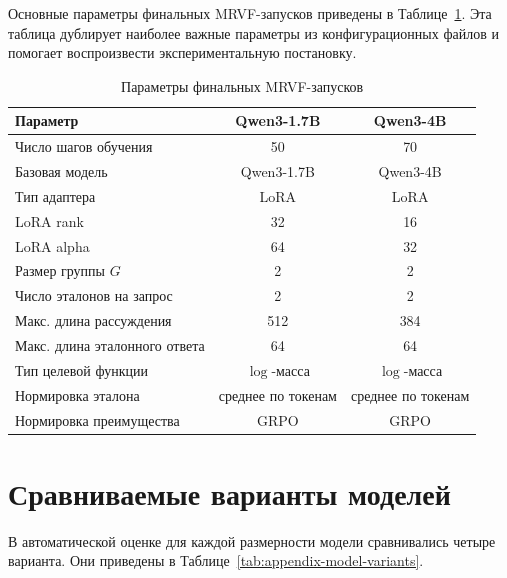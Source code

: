 Основные параметры финальных MRVF-запусков приведены в Таблице~\ref{tab:appendix-training-configs}. Эта таблица дублирует наиболее важные параметры из конфигурационных файлов и помогает воспроизвести экспериментальную постановку.

\begin{table}[h]
    \centering
    \caption{Параметры финальных MRVF-запусков}
    \label{tab:appendix-training-configs}
    \begin{tabular}{lcc}
        \hline
        Параметр                      & Qwen3-1.7B         & Qwen3-4B           \\
        \hline
        Число шагов обучения          & 50                 & 70                 \\
        Базовая модель                & Qwen3-1.7B         & Qwen3-4B           \\
        Тип адаптера                  & LoRA               & LoRA               \\
        LoRA rank                     & 32                 & 16                 \\
        LoRA alpha                    & 64                 & 32                 \\
        Размер группы \(G\)           & 2                  & 2                  \\
        Число эталонов на запрос      & 2                  & 2                  \\
        Макс. длина рассуждения       & 512                & 384                \\
        Макс. длина эталонного ответа & 64                 & 64                 \\
        Тип целевой функции           & \(\log\)-масса     & \(\log\)-масса     \\
        Нормировка эталона            & среднее по токенам & среднее по токенам \\
        Нормировка преимущества       & GRPO               & GRPO               \\
        \hline
    \end{tabular}
\end{table}

\section{Сравниваемые варианты моделей}

В автоматической оценке для каждой размерности модели сравнивались четыре варианта. Они приведены в Таблице~\ref{tab:appendix-model-variants}.

